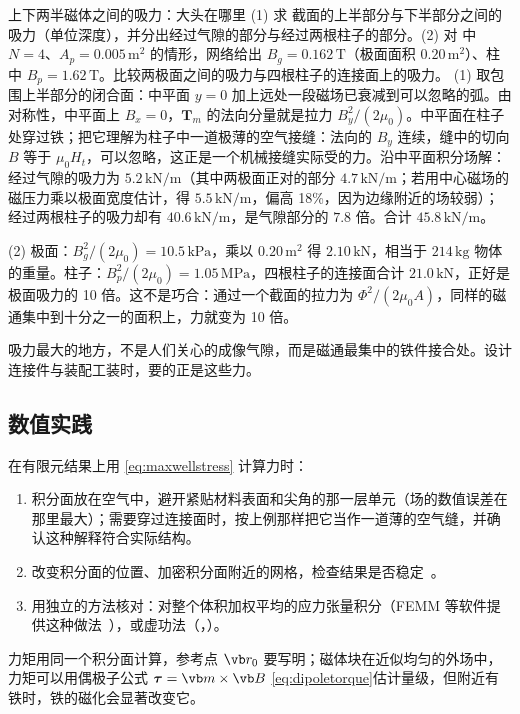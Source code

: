 \begin{example}[label=ex:magnets-force]{上下两半磁体之间的吸力：大头在哪里}
(1) 求 截面的上半部分与下半部分之间的吸力（单位深度），并分出经过气隙的部分与经过两根柱子的部分。(2) 对 中 $N=4$、$A_p=0.005\,\mathrm{m^2}$ 的情形，网络给出 $B_g=0.162\,\mathrm T$（极面面积 $0.20\,\mathrm{m^2}$）、柱中 $B_p=1.62\,\mathrm T$。比较两极面之间的吸力与四根柱子的连接面上的吸力。
\solution
(1) 取包围上半部分的闭合面：中平面 $y=0$ 加上远处一段磁场已衰减到可以忽略的弧。由对称性，中平面上 $B_x=0$，$\mathbf T_m$ 的法向分量就是拉力 $B_y^2/(2\mu_0)$。中平面在柱子处穿过铁；把它理解为柱子中一道极薄的空气接缝：法向的 $B_y$ 连续，缝中的切向 $B$ 等于 $\mu_0H_t$，可以忽略，这正是一个机械接缝实际受的力。沿中平面积分场解：经过气隙的吸力为 $5.2\,\mathrm{kN/m}$（其中两极面正对的部分 $4.7\,\mathrm{kN/m}$；若用中心磁场的磁压力乘以极面宽度估计，得 $5.5\,\mathrm{kN/m}$，偏高 18\%，因为边缘附近的场较弱）；经过两根柱子的吸力却有 $40.6\,\mathrm{kN/m}$，是气隙部分的 $7.8$ 倍。合计 $45.8\,\mathrm{kN/m}$。

(2) 极面：$B_g^2/(2\mu_0)=10.5\,\mathrm{kPa}$，乘以 $0.20\,\mathrm{m^2}$ 得 $2.10\,\mathrm{kN}$，相当于 $214\,\mathrm{kg}$ 物体的重量。柱子：$B_p^2/(2\mu_0)=1.05\,\mathrm{MPa}$，四根柱子的连接面合计 $21.0\,\mathrm{kN}$，正好是极面吸力的 10 倍。这不是巧合：通过一个截面的拉力为 $\Phi^2/(2\mu_0A)$，同样的磁通集中到十分之一的面积上，力就变为 10 倍。

吸力最大的地方，不是人们关心的成像气隙，而是磁通最集中的铁件接合处。设计连接件与装配工装时，要的正是这些力。
\end{example}

\subsection{数值实践}
在有限元结果上用 \eqref{eq:maxwellstress} 计算力时：
\begin{enumerate}
\item 积分面放在空气中，避开紧贴材料表面和尖角的那一层单元（场的数值误差在那里最大）；需要穿过连接面时，按上例那样把它当作一道薄的空气缝，并确认这种解释符合实际结构。
\item 改变积分面的位置、加密积分面附近的网格，检查结果是否稳定~\cite{haus,femm}。
\item 用独立的方法核对：对整个体积加权平均的应力张量积分（FEMM 等软件提供这种做法~\cite{femm}），或虚功法（，）。
\end{enumerate}
力矩用同一个积分面计算，参考点 $\vb r_0$ 要写明；磁体块在近似均匀的外场中，力矩可以用偶极子公式 $\boldsymbol\tau=\vb m\times\vb B$ \eqref{eq:dipoletorque}估计量级，但附近有铁时，铁的磁化会显著改变它。

